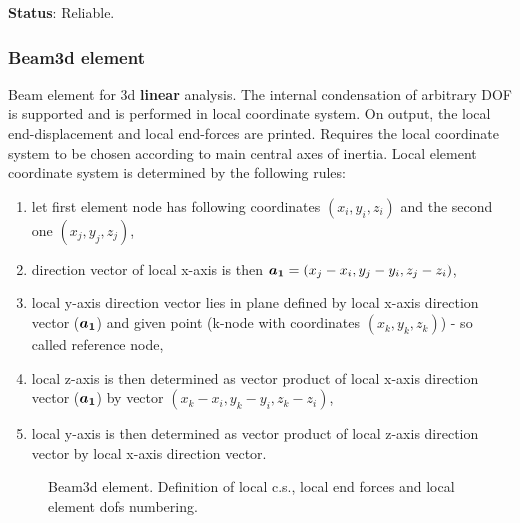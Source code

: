 \documentclass[12pt,dvips]{article}
\newcommand{\mbf}[1]{\mbox{\boldmath$#1$}}
\newcommand{\descitem}[1]{{\noindent \bf #1}:}
\begin{document}
\descitem{Status} Reliable.

\subsubsection{Beam3d element}
Beam element for 3d {\bf linear} analysis. The internal condensation
of arbitrary DOF is supported and is performed in local coordinate
system. On output, the local end-displacement and local end-forces are
printed. Requires the local coordinate system to be chosen according
to main central axes of inertia. Local element 
coordinate system is determined by the following rules:
\begin{enumerate}
\item let first element node has following coordinates $(x_i, y_i, z_i)$
and the second one $(x_j, y_j, z_j)$,
\item direction vector of local x-axis is then $\mbf{a_1} = (x_j-x_i, y_j-y_i, z_j-z_i)$,
\item local y-axis direction vector lies in plane defined by local
x-axis direction vector ($\mbf{a_1}$) and given
point (k-node with coordinates $(x_k, y_k, z_k)$) - so called reference node,
\item local z-axis is then determined as vector product of local
x-axis direction vector ($\mbf{a_1}$) by vector $(x_k-x_i, y_k-y_i, z_k-z_i)$,
\item local y-axis is then determined as vector product of local
z-axis direction vector by local x-axis direction vector. 
\end{enumerate}
\begin{figure}[tb]
\begin{center}\end{center}
\caption{Beam3d element. Definition of local c.s., local end forces
and local element dofs numbering.}
\label{beam3dfig}
\end{figure}
\end{document}
